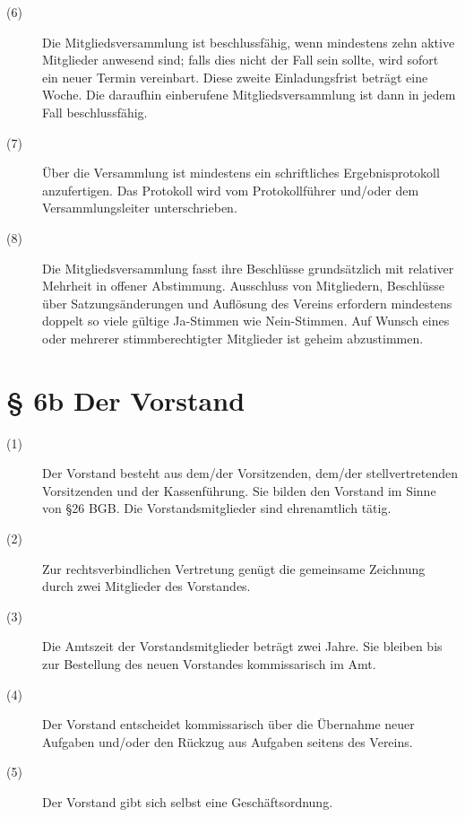 \documentclass[a4paper,12pt]{scrartcl}
\begin{document}
\begin{description}
\item[(6)] Die Mitgliedsversammlung ist beschlussfähig, wenn mindestens zehn aktive Mitglieder anwesend sind; falls dies nicht der Fall sein sollte, wird sofort ein neuer Termin vereinbart. Diese zweite Einladungsfrist beträgt eine Woche. Die daraufhin einberufene Mitgliedsversammlung ist dann in jedem Fall beschlussfähig.
\item[(7)] Über die Versammlung ist mindestens ein schriftliches Ergebnisprotokoll anzufertigen. Das Protokoll wird vom Protokollführer und/oder dem Versammlungsleiter unterschrieben.
\item[(8)] Die Mitgliedsversammlung fasst ihre Beschlüsse grundsätzlich mit relativer Mehrheit in offener Abstimmung. Ausschluss von Mitgliedern, Beschlüsse über Satzungsänderungen und Auflösung des Vereins erfordern mindestens doppelt so viele gültige Ja-Stimmen wie Nein-Stimmen. Auf Wunsch eines oder mehrerer stimmberechtigter Mitglieder ist geheim abzustimmen.

\end{description}



\section*{\S{} 6b Der Vorstand}
\begin{description} 

\item[(1)] Der Vorstand besteht aus dem/der Vorsitzenden, dem/der stellvertretenden Vorsitzenden und der Kassenführung. Sie bilden den Vorstand im Sinne von §26 BGB. Die Vorstandsmitglieder sind ehrenamtlich tätig.
\item[(2)] Zur rechtsverbindlichen Vertretung genügt die gemeinsame Zeichnung durch zwei Mitglieder des Vorstandes.
\item[(3)] Die Amtszeit der Vorstandsmitglieder beträgt zwei Jahre. Sie bleiben bis zur Bestellung des neuen Vorstandes kommissarisch im Amt.
\item[(4)] Der Vorstand entscheidet kommissarisch über die Übernahme neuer Aufgaben und/oder den Rückzug aus Aufgaben seitens des Vereins. %
\item[(5)] Der Vorstand gibt sich selbst eine Geschäftsordnung.

\end{description}
\end{document}
